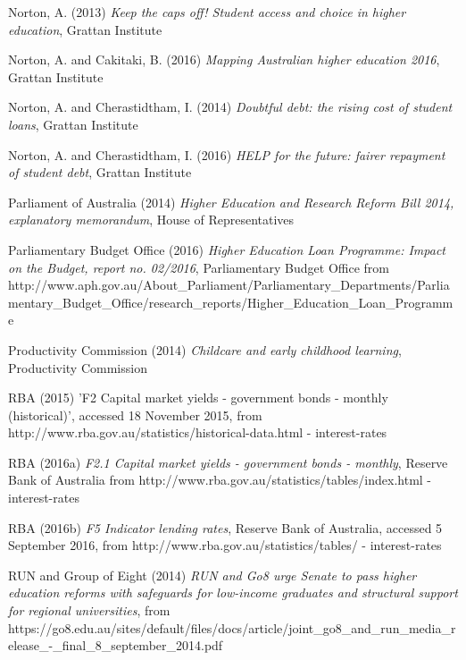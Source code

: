 \documentclass[]{book}
\begin{document}
\protect\hypertarget{_ENREF_60}{}{}Norton, A. (2013) \emph{Keep the caps off! Student access and choice in higher education}, Grattan Institute

\protect\hypertarget{_ENREF_61}{}{}Norton, A. and Cakitaki, B. (2016) \emph{Mapping Australian higher education 2016}, Grattan Institute

\protect\hypertarget{_ENREF_62}{}{}Norton, A. and Cherastidtham, I. (2014) \emph{Doubtful debt: the rising cost of student loans}, Grattan Institute

\protect\hypertarget{_ENREF_63}{}{}Norton, A. and Cherastidtham, I. (2016) \emph{HELP for the future: fairer repayment of student debt}, Grattan Institute

\protect\hypertarget{_ENREF_64}{}{}Parliament of Australia (2014) \emph{Higher Education and Research Reform Bill 2014, explanatory memorandum}, House of Representatives

\protect\hypertarget{_ENREF_65}{}{}Parliamentary Budget Office (2016) \emph{Higher Education Loan Programme: Impact on the Budget, report no. 02/2016}, Parliamentary Budget Office from http://www.aph.gov.au/About\_Parliament/Parliamentary\_Departments/Parliamentary\_Budget\_Office/research\_reports/Higher\_Education\_Loan\_Programme

\protect\hypertarget{_ENREF_66}{}{}Productivity Commission (2014) \emph{Childcare and early childhood learning}, Productivity Commission

\protect\hypertarget{_ENREF_67}{}{}RBA (2015) 'F2 Capital market yields - government bonds - monthly (historical)', accessed 18 November 2015, from http://www.rba.gov.au/statistics/historical-data.html - interest-rates

\protect\hypertarget{_ENREF_68}{}{}RBA (2016a) \emph{F2.1 Capital market yields - government bonds - monthly}, Reserve Bank of Australia from http://www.rba.gov.au/statistics/tables/index.html - interest-rates

\protect\hypertarget{_ENREF_69}{}{}RBA (2016b) \emph{F5 Indicator lending rates}, Reserve Bank of Australia, accessed 5 September 2016, from http://www.rba.gov.au/statistics/tables/ - interest-rates

\protect\hypertarget{_ENREF_70}{}{}RUN and Group of Eight (2014) \emph{RUN and Go8 urge Senate to pass higher education reforms with safeguards for low-income graduates and structural support for regional universities}, from https://go8.edu.au/sites/default/files/docs/article/joint\_go8\_and\_run\_media\_release\_-\_final\_8\_september\_2014.pdf
\end{document}
